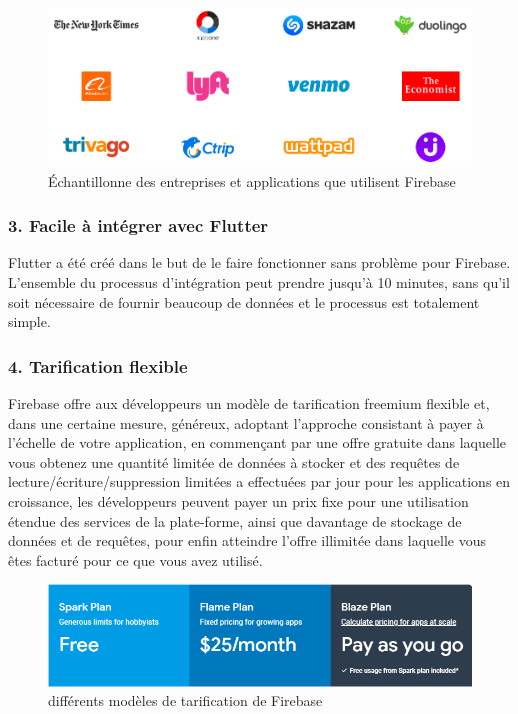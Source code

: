 \begin{figure}[h]
	\begin{center}
		\includegraphics[width=13cm]{Images/chapter2/trusting_apps.png}
		\caption{{\footnotesize Échantillonne des entreprises et applications que utilisent Firebase}}
	\end{center}
\end{figure}

\subsubsection{3. Facile à intégrer avec Flutter}
Flutter a été créé dans le but de le faire fonctionner sans problème pour Firebase. L'ensemble du processus d'intégration peut prendre jusqu'à 10 minutes, sans qu'il soit nécessaire de fournir beaucoup de données et le processus est totalement simple.\cite{noauthor_using_nodate}

\subsubsection{4. Tarification flexible}
Firebase offre aux développeurs un modèle de tarification \gls{freemium} flexible et, dans une certaine mesure, généreux, adoptant l’approche consistant à payer à l’échelle de votre application, en commençant par une offre gratuite dans laquelle vous obtenez une quantité limitée de données à stocker et des requêtes de lecture/écriture/suppression limitées a effectuées par jour pour les applications en croissance, les développeurs peuvent payer un prix fixe pour une utilisation étendue des services de la plate-forme, ainsi que davantage de stockage de données et de requêtes, pour enfin atteindre l'offre illimitée dans laquelle vous êtes facturé pour ce que vous avez utilisé.\cite{noauthor_firebase_nodate}\bigskip

\begin{figure}[h]
	\begin{center}
		\includegraphics[width=14cm]{Images/chapter2/firebase_pricing_offers.png}
		\caption{{\footnotesize différents modèles de tarification de Firebase}}
	\end{center}
\end{figure}
\newpage

